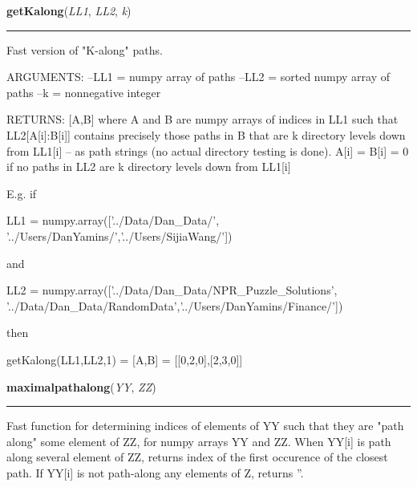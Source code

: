     \label{System:Utils:getKalong}

    \vspace{0.5ex}

\hspace{.8\funcindent}\begin{boxedminipage}{\funcwidth}

    \raggedright \textbf{getKalong}(\textit{LL1}, \textit{LL2}, \textit{k})

    \vspace{-1.5ex}

    \rule{\textwidth}{0.5\fboxrule}
\setlength{\parskip}{2ex}
    Fast version of "K-along" paths.

    ARGUMENTS: --LL1 = numpy array of paths --LL2 = sorted numpy array of 
    paths --k = nonnegative integer

    RETURNS: [A,B] where A and B are numpy arrays of indices in LL1 such 
    that LL2[A[i]:B[i]] contains precisely those paths in B that are k 
    directory levels down from LL1[i] -- as path strings (no actual 
    directory testing is done).  A[i] = B[i] = 0 if no paths in LL2 are k 
    directory levels down from LL1[i]

    E.g. if

    LL1 = numpy.array(['../Data/Dan\_Data/', 
    '../Users/DanYamins/','../Users/SijiaWang/'])

    and

    LL2 = numpy.array(['../Data/Dan\_Data/NPR\_Puzzle\_Solutions', 
    '../Data/Dan\_Data/RandomData','../Users/DanYamins/Finance/'])

    then

    getKalong(LL1,LL2,1) = [A,B] = [[0,2,0],[2,3,0]]

\setlength{\parskip}{1ex}
    \end{boxedminipage}

    \label{System:Utils:maximalpathalong}

    \vspace{0.5ex}

\hspace{.8\funcindent}\begin{boxedminipage}{\funcwidth}

    \raggedright \textbf{maximalpathalong}(\textit{YY}, \textit{ZZ})

    \vspace{-1.5ex}

    \rule{\textwidth}{0.5\fboxrule}
\setlength{\parskip}{2ex}
    Fast function for determining indices of elements of YY such that they 
    are "path along" some element of ZZ, for numpy arrays YY and ZZ.  When 
    YY[i] is path along several element of ZZ, returns index of the first 
    occurence of the closest path.  If YY[i] is not path-along any elements
    of Z, returns ''.

\setlength{\parskip}{1ex}
    \end{boxedminipage}

